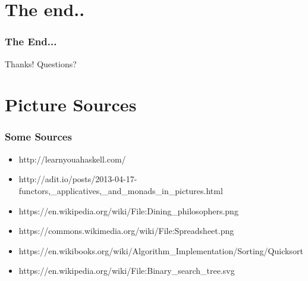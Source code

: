 \documentclass[12pt, xcolor=table]{beamer}
\begin{document}
\section{The end..} %
\begin{frame}
    \frametitle{The End...}
    \begin{block}{Thanks!}
        Questions?
    \end{block}
\end{frame}

\section{Picture Sources}
\begin{frame}
    \frametitle{Some Sources}
    \begin{itemize}
        \item \tiny{http://learnyouahaskell.com/}
        \item \tiny{http://adit.io/posts/2013-04-17-functors,\_applicatives,\_and\_monads\_in\_pictures.html}
        \item \tiny{https://en.wikipedia.org/wiki/File:Dining\_philosophers.png}
        \item \tiny{https://commons.wikimedia.org/wiki/File:Spreadsheet.png}
        \item \tiny{https://en.wikibooks.org/wiki/Algorithm\_Implementation/Sorting/Quicksort}
        \item \tiny{https://en.wikipedia.org/wiki/File:Binary\_search\_tree.svg}
    \end{itemize}
\end{frame}
\end{document}
